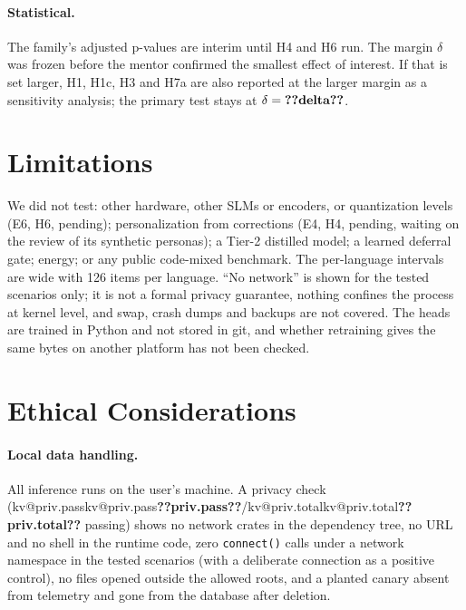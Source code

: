 \documentclass[11pt,a4paper]{article}
\makeatletter
\DeclareRobustCommand{\kv}[1]{\ifcsname kv@#1\endcsname\csname kv@#1\endcsname\else\textbf{??#1??}\fi}
\makeatother
\begin{document}
\paragraph{Statistical.} The family's adjusted p-values are interim until H4 and H6 run. The margin $\delta$ was frozen
before the mentor confirmed the smallest effect of interest. If that is set larger, H1, H1c, H3 and H7a are also
reported at the larger margin as a sensitivity analysis; the primary test stays at $\delta=\kv{delta}$.

\section{Limitations}\label{sec:limits}

We did not test: other hardware, other SLMs or encoders, or quantization levels (E6, H6, pending); personalization from
corrections (E4, H4, pending, waiting on the review of its synthetic personas); a Tier-2 distilled model; a learned
deferral gate; energy; or any public code-mixed benchmark. The per-language intervals are wide with 126 items per
language. ``No network'' is shown for the tested scenarios only; it is not a formal privacy guarantee, nothing confines
the process at kernel level, and swap, crash dumps and backups are not covered. The heads are trained in Python and
not stored in git, and whether retraining gives the same bytes on another platform has not been checked.

\section{Ethical Considerations}\label{sec:ethics}

\paragraph{Local data handling.} All inference runs on the user's machine. A privacy check
(\kv{priv.pass}/\kv{priv.total} passing) shows no network crates in the dependency tree, no URL and no shell in the
runtime code, zero \texttt{connect()} calls under a network namespace in the tested scenarios (with a deliberate
connection as a positive control), no files opened outside the allowed roots, and a planted canary absent from
telemetry and gone from the database after deletion.
\end{document}
